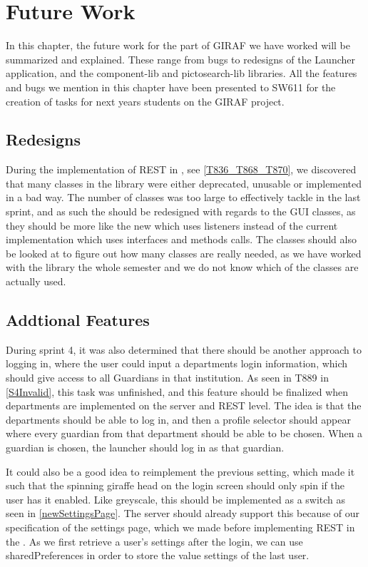\chapter{Future Work}\label{fwork}
In this chapter, the future work for the part of GIRAF we have worked will be
summarized and explained. These range from bugs to redesigns of the Launcher
application, and the component-lib and pictosearch-lib libraries.
All the features and bugs we mention in this chapter have been presented to
SW611 for the creation of tasks for next years students on the GIRAF project.

\section{Redesigns}
During the implementation of REST in , see
\autoref{T836_T868_T870}, we discovered that many classes in the library were
either deprecated, unusable or implemented in a bad way. The number of classes
was too large to effectively tackle in the last sprint, and as such the
 should be redesigned with regards to the GUI classes, as
they should be more like the new  which uses listeners
instead of the current implementation which uses interfaces and methods calls.
The classes should also be looked at to figure out how many classes are really
needed, as we have worked with the library the whole semester and we do not
know which of the classes are actually used.

\section{Addtional Features}
During sprint 4, it was also determined that there should be another
approach to logging in, where the user could input a departments login information, which
should give access to all Guardians in that institution. As seen in T889 in
\autoref{S4Invalid}, this task was unfinished, and this feature should be
finalized when departments are implemented on the server and REST level. The
idea is that the departments should be able to log in, and then a profile
selector should appear where every guardian from that department should be able
to be chosen. When a guardian is chosen, the launcher should log in as that
guardian.\nl

It could also be a good idea to reimplement the previous setting, which made it
such that the spinning giraffe head on the login screen should only spin if the
user has it enabled. Like greyscale, this should be implemented as a switch as
seen in \autoref{newSettingsPage}. The server should already support this
because of our specification of the settings page, which we made before
implementing REST in the . As we first retrieve a user's settings
after the login, we can use sharedPreferences in order to store the value
settings of the last user.

